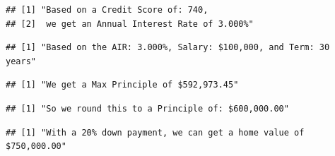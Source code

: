 \documentclass[12pt]{article}
\newenvironment{Section}[1]{}{\newpage}
\newenvironment{Shaded}{\begin{snugshade}}{\end{snugshade}}
\newcommand{\FloatTok}[1]{\textcolor[rgb]{0.00,0.00,0.81}{#1}}
\newcommand{\KeywordTok}[1]{\textcolor[rgb]{0.13,0.29,0.53}{\textbf{#1}}}
\newcommand{\NormalTok}[1]{#1}
\newcommand{\OperatorTok}[1]{\textcolor[rgb]{0.81,0.36,0.00}{\textbf{#1}}}
\newcommand{\StringTok}[1]{\textcolor[rgb]{0.31,0.60,0.02}{#1}}
\begin{document}
\begin{Section}{Example A}
\begin{singlespace}
\begin{verbatim}
## [1] "Based on a Credit Score of: 740, 
## [2]  we get an Annual Interest Rate of 3.000%"
\end{verbatim}

\begin{Shaded}
\end{Shaded}

\begin{verbatim}
## [1] "Based on the AIR: 3.000%, Salary: $100,000, and Term: 30 years"
\end{verbatim}

\begin{Shaded}
\end{Shaded}

\begin{verbatim}
## [1] "We get a Max Principle of $592,973.45"
\end{verbatim}

\begin{Shaded}
\end{Shaded}

\begin{verbatim}
## [1] "So we round this to a Principle of: $600,000.00"
\end{verbatim}

\begin{Shaded}
\end{Shaded}

\begin{verbatim}
## [1] "With a 20% down payment, we can get a home value of $750,000.00"
\end{verbatim}


\end{singlespace}
\end{Section}
\end{document}
